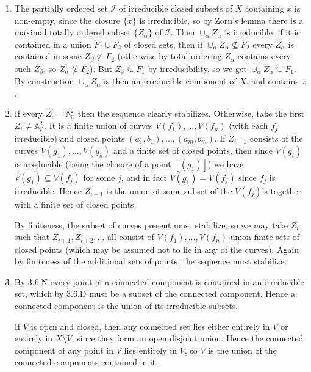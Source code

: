 \documentclass{report}
\newcommand{\closure}[1]{\overline{#1}} %
\newcommand{\I}{\mathscr{I}}
\newcommand{\A}{\mathbb{A}}
\newcommand{\C}{\mathbb{C}}
\begin{document}
\begin{enumerate}[label=\textbf{3.6.\Alph*.}]
	\item The partially ordered set $\I$ of irreducible closed subsets of $X$
	      containing $x$ is non-empty, since the closure $\closure{\{x\}}$ is
	      irreducible, so by Zorn's lemma there is a maximal totally ordered
	      subset $\{Z_\alpha\}$ of $\I$. Then $\cup_\alpha Z_\alpha$ is
	      irreducible; if it is contained in a union $F_1\cup F_2$ of closed sets,
	      then if $\cup_\alpha Z_\alpha\not\subseteq F_2$ every $Z_\alpha$ is
	      contained in some $Z_\beta\not\subseteq F_2$ (otherwise by total
	      ordering $Z_\alpha$ contains every such $Z_\beta$, so
	      $Z_\alpha\not\subseteq F_2$). But $Z_\beta\subseteq F_1$ by
	      irreducibility, so we get $\cup_\alpha Z_\alpha\subseteq F_1$. By
	      construction $\cup_\alpha Z_\alpha$ is then an irreducible component of
	      $X$, and contains $x$.

	\item If every $Z_i=\A^2_\C$ then the sequence clearly stabilizes. Otherwise,
	      take the first $Z_i\ne\A^2_\C$. It is a finite union of curves
	      $V(f_1),\ldots,V(f_n)$ (with each $f_j$ irreducible) and closed points
	      $(a_1,b_1),\ldots,(a_m,b_m)$. If $Z_{i+1}$ consists of the curves
	      $V(g_1),\ldots,V(g_k)$ and a finite set of closed points, then since
	      $V(g_i)$ is irreducible (being the closure of a point $[(g_1)]$) we have
	      $V(g_1)\subseteq V(f_j)$ for some $j$, and in fact $V(g_1)=V(f_j)$ since
	      $f_j$ is irreducible. Hence $Z_{i+1}$ is the union of some subset of the
	      $V(f_j)$'s together with a finite set of closed points.

	      By finiteness, the subset of curves present must stabilize, so we may
	      take $Z_i$ such that $Z_{i+1},Z_{i+2},\ldots$ all consist of
	      $V(f_1),\ldots,V(f_n)$ union finite sets of closed points (which may be
	      assumed not to lie in any of the curves). Again by finiteness of the
	      additional sets of points, the sequence must stabilize.

	\item By 3.6.N every point of a connected component is contained in an
	      irreducible set, which by 3.6.D must be a subset of the connected
	      component. Hence a connected component is the union of its irreducible
	      subsets.

	      If $V$ is open and closed, then any connected set lies either entirely
	      in $V$ or entirely in $X\setminus V$, since they form an open disjoint
	      union. Hence the connected component of any point in $V$ lies entirely
	      in $V$, so $V$ is the union of the connected components contained in it.


\end{enumerate}
\end{document}
